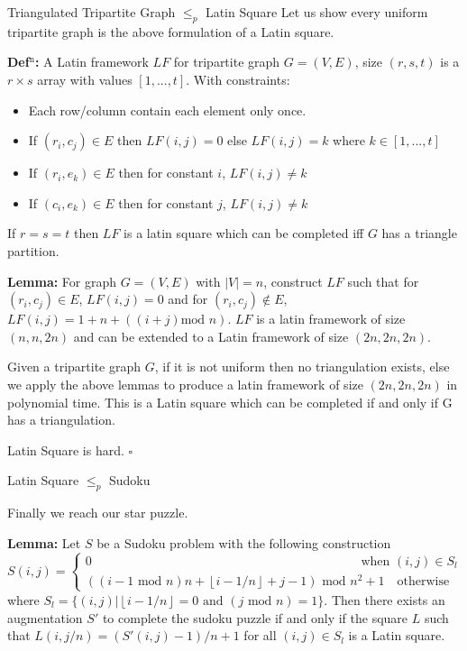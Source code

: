 \documentclass[final]{beamer}
\newlength{\colwidth}
\newcounter{row}
\newcounter{col}
\begin{document}
\begin{frame}[t]
\begin{columns}[t]
\begin{column}{\colwidth}
\begin{block}{Triangulated Tripartite Graph $\leq_p$ Latin Square \cite{COLBOURN198425}}
Let us show every uniform tripartite graph is the above formulation of a Latin square.

\textbf{Def$^{\text{n}}$:} A Latin framework $LF$ for tripartite graph $G=(V,E)$, size $(r,s,t)$ is a $r \times s$ array with values $[1,...,t]$. With constraints:
\begin{itemize}
\item{Each row/column contain each element only once.}
\item{If $(r_i,c_j)\in E$ then $LF(i,j)=0$ else $LF(i,j)= k$ where $k\in [1,...,t]$}
\item{If $(r_i,e_k)\in E$  then for constant $i$, $LF(i,j)\neq k$}
\item{If $(c_i,e_k)\in E$  then for constant $j$, $LF(i,j)\neq k$}
\end{itemize}
If $r=s=t$ then $LF$ is a latin square which can be completed iff $G$ has a triangle partition.

\textbf{Lemma:} For graph $G=(V,E)$ with $|V|=n$, construct $LF$ such that for $(r_i,c_j)\in E$, $LF(i,j)=0$ and for $(r_i,c_j)\not\in E$, $LF(i,j)=1+n+((i+j)\text{mod }n)$. $ LF$ is a latin framework of size $(n,n,2n)$ and can be extended to a Latin framework of size $(2n,2n,2n)$.

Given a tripartite graph $G$, if it is not uniform then no triangulation exists, else we apply the above lemmas to produce a latin framework of size $(2n,2n,2n)$ in polynomial time. This is a Latin square which can be completed if and only if G has a triangulation. 

Latin Square is hard. $\square$

  \end{block}
\begin{block}{ Latin Square $\leq_p$ Sudoku \cite{article}}

Finally we reach our star puzzle.

\textbf{Lemma:} Let $S$ be a Sudoku problem with the following construction 
\begin{equation}
	S(i,j) =\begin{cases}
0 \qquad\qquad\qquad\qquad\qquad\qquad\qquad\qquad\quad\qquad\qquad\text{   when  } (i,j) \in S_l \\ 
((i-1 \text{ mod } n)n + \left\lfloor{i-1/n}\right\rfloor+j-1)\text{ mod } n^2 +1 \quad\text{otherwise}
\end{cases}
\end{equation}
where $S_l=\{(i,j)| \left\lfloor{i-1/n}\right\rfloor=0 \text{ and }(j \text{ mod }n)=1\}$. Then there exists an augmentation $S'$ to complete the sudoku puzzle if and only if the square $L$ such that $L(i,j/n)=(S'(i,j)-1)/n+1$ for all $(i,j) \in S_l$ is a Latin square.


\end{block}
\end{column}
\end{columns}
\end{frame}
\end{document}
